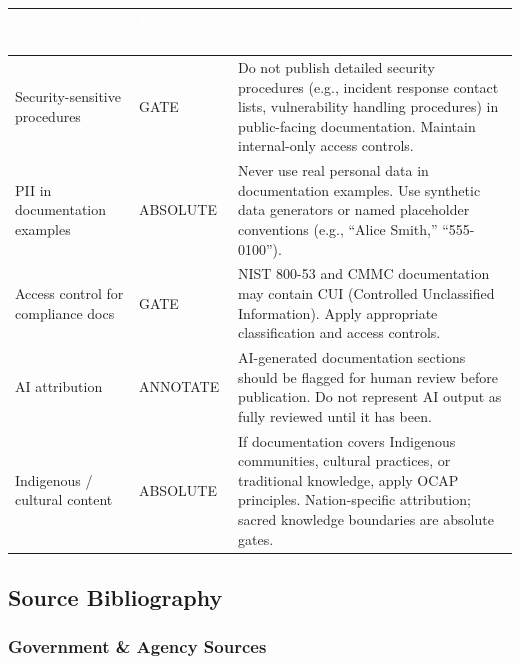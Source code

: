 \documentclass[11pt,letterpaper]{article}
\newcommand{\tableheader}[1]{\textbf{\sffamily\textcolor{white}{#1}}}
\begin{document}
\begin{center}
\begin{tabularx}{\textwidth}{L{4cm}L{3cm}X}
\toprule
{}
\tableheader{Area} & \tableheader{Boundary Type} & \tableheader{Guidance} \\
\midrule
Security-sensitive procedures & GATE & Do not publish detailed security procedures (e.g., incident response contact lists, vulnerability handling procedures) in public-facing documentation. Maintain internal-only access controls. \\
PII in documentation examples & ABSOLUTE & Never use real personal data in documentation examples. Use synthetic data generators or named placeholder conventions (e.g., ``Alice Smith,'' ``555-0100''). \\
Access control for compliance docs & GATE & NIST 800-53 and CMMC documentation may contain CUI (Controlled Unclassified Information). Apply appropriate classification and access controls. \\
AI attribution & ANNOTATE & AI-generated documentation sections should be flagged for human review before publication. Do not represent AI output as fully reviewed until it has been. \\
Indigenous / cultural content & ABSOLUTE & If documentation covers Indigenous communities, cultural practices, or traditional knowledge, apply OCAP principles. Nation-specific attribution; sacred knowledge boundaries are absolute gates. \\
\bottomrule
\end{tabularx}
\end{center}

\subsection{Source Bibliography}

\subsubsection{Government \& Agency Sources}
\end{document}
